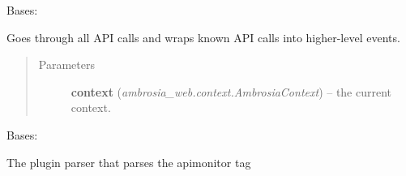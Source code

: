 \documentclass[letterpaper,10pt,english]{sphinxmanual}
\begin{document}

\begin{fulllineitems}
\label{ambrosia_plugins.apimonitor:ambrosia_plugins.apimonitor.ApiCallCorrelator}
Bases: {\hyperref[ambrosia:ambrosia.Correlator]{}}

Goes through all API calls and wraps known API calls into higher-level events.
\begin{quote}\begin{description}
\item[{Parameters}] \leavevmode
\textbf{context} (\emph{ambrosia\_web.context.AmbrosiaContext}) -- the current context.

\end{description}\end{quote}

\begin{fulllineitems}
\label{ambrosia_plugins.apimonitor:ambrosia_plugins.apimonitor.ApiCallCorrelator.correlate}
\end{fulllineitems}


\end{fulllineitems}


\begin{fulllineitems}
\label{ambrosia_plugins.apimonitor:ambrosia_plugins.apimonitor.ApimonitorPluginParser}
Bases: {\hyperref[ambrosia:ambrosia.ResultParser]{}}

The plugin parser that parses the apimonitor tag

\begin{fulllineitems}
\label{ambrosia_plugins.apimonitor:ambrosia_plugins.apimonitor.ApimonitorPluginParser.finish}
\end{fulllineitems}


\begin{fulllineitems}
\label{ambrosia_plugins.apimonitor:ambrosia_plugins.apimonitor.ApimonitorPluginParser.parse}
\end{fulllineitems}


\end{fulllineitems}
\end{document}
